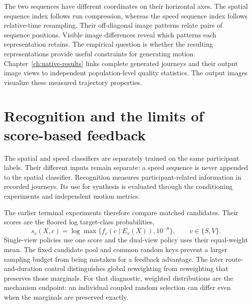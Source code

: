 
The two sequences have different coordinates on their horizontal axes. The spatial sequence index follows run compression, whereas the speed sequence index follows relative-time resampling. Their off-diagonal image patterns relate pairs of sequence positions. Visible image differences reveal which patterns each representation retains. The empirical question is whether the resulting representations provide useful constraints for generating motion. Chapter~\ref{ch:native-results} links complete generated journeys and their output image views to independent population-level quality statistics. The output images visualize these measured trajectory properties.

\section{Recognition and the limits of score-based feedback}
The spatial and speed classifiers are separately trained on the same participant labels. Their different inputs remain separate: a speed sequence is never appended to the spatial classifier. Recognition measures participant-related information in recorded journeys. Its use for synthesis is evaluated through the conditioning experiments and independent motion metrics.

The earlier terminal experiments therefore compare matched candidates. Their scores are the floored log target-class probabilities,
\begin{equation}
 s_v(X,c)=\log\max\{f_v(c\mid E_v(X)),10^{-8}\},\qquad v\in\{S,V\}.
 \label{eq:native-feedback-scores}
\end{equation}
Single-view policies use one score and the dual-view policy uses their equal-weight mean. The fixed candidate pool and common random keys prevent a larger sampling budget from being mistaken for a feedback advantage. The later route-and-duration control distinguishes global reweighting from reweighting that preserves those marginals. For that diagnostic, weighted distributions are the mechanism endpoint: an individual coupled random selection can differ even when the marginals are preserved exactly.

